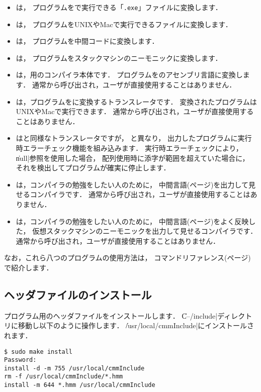 \begin{itemize}
\item {\cme}は，
{\cmm}プログラムを{\tac}で実行できる「{\tt .exe}」ファイルに変換します．
\item {\cmc}は，
{\cmm}プログラムをUNIXやMacで実行できるファイルに変換します．
\item {\cmi}は，
{\cmm}プログラムを中間コードに変換します．
\item {\cmv}は，
{\cmm}プログラムをスタックマシンのニーモニックに変換します．
\item {\cmmc}は，{\tac}用の{\cmml}コンパイラ本体です．
{\cmm}プログラムを{\tac}のアセンブリ言語に変換します．
通常{\cme}から呼び出され，ユーザが直接使用することはありません．
\item {\ccmmc}は，{\cmm}プログラムを{\cl}に変換するトランスレータです．
変換された{\cl}プログラムはUNIXやMacで実行できます．
通常{\cmc}から呼び出され，ユーザが直接使用することはありません．
\item {\rtccmmc}は{\ccmmc}と同様なトランスレータですが，
{\ccmmc}と異なり，
出力したプログラムに実行時エラーチェック機能を組み込みます．
実行時エラーチェックにより，
\|null|参照を使用した場合，
配列使用時に添字が範囲を超えていた場合に，
それを検出してプログラムが確実に停止します．
\item {\icmmc}は，コンパイラの勉強をしたい人のために，
中間言語(\pageref{app:vm}ページ)を出力して見せるコンパイラです．
通常{\cmi}から呼び出され，ユーザが直接使用することはありません．
\item {\vcmmc}は，コンパイラの勉強をしたい人のために，
中間言語(\pageref{app:vm}ページ)をよく反映した，
仮想スタックマシンのニーモニックを出力して見せるコンパイラです．
通常{\cmv}から呼び出され，ユーザが直接使用することはありません．
\end{itemize}

なお，これら八つのプログラムの使用方法は，
コマンドリファレンス(\pageref{app:command}ページ)で紹介します．

\subsection{ヘッダファイルのインストール}

{\cmml}プログラム用のヘッダファイルをインストールします．
\|C--/include|ディレクトリに移動し以下のように操作します．
\|/usr/local/cmmInclude|にインストールされます．

\begin{mylist}
\begin{verbatim}
$ sudo make install
Password:
install -d -m 755 /usr/local/cmmInclude
rm -f /usr/local/cmmInclude/*.hmm
install -m 644 *.hmm /usr/local/cmmInclude
\end{verbatim}
\end{mylist}

